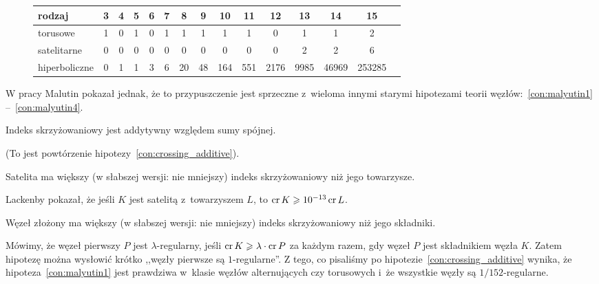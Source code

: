 \begin{figure}[H]
\renewcommand*{\arraystretch}{1.4}
\footnotesize
\begin{longtable}{lcccccccccccccc}
\hline
    \textbf{rodzaj} & 3 & 4 & 5 & 6 & 7 & 8  & 9  & 10  & 11  & 12   & 13   & 14    & 15     \\ \hline \endhead
    torusowe        & 1 & 0 & 1 & 0 & 1 & 1  & 1  & 1   & 1   & 0    & 1    & 1     & 2      \\
    satelitarne     & 0 & 0 & 0 & 0 & 0 & 0  & 0  & 0   & 0   & 0    & 2    & 2     & 6      \\
    hiperboliczne   & 0 & 1 & 1 & 3 & 6 & 20 & 48 & 164 & 551 & 2176 & 9985 & 46969 & 253285 \\
    \hline
\end{longtable}
\normalsize
\end{figure}

W pracy \cite{malyutin2016} Malutin pokazał jednak, że to przypuszczenie jest sprzeczne z~wieloma innymi starymi hipotezami teorii węzłów:~\ref{con:malyutin1} --~\ref{con:malyutin4}.
%

\begin{conjecture}
\label{con:malyutin1}%
    Indeks skrzyżowaniowy jest addytywny względem sumy spójnej.
%
%
\end{conjecture}

(To jest powtórzenie hipotezy~\ref{con:crossing_additive}).

\begin{conjecture}
    Satelita ma większy (w słabszej wersji: nie mniejszy) indeks skrzyżowaniowy niż jego towarzysze.
\end{conjecture}

Lackenby \cite{lackenby2014} pokazał, że jeśli $K$ jest satelitą z~towarzyszem $L$, to $\operatorname{cr} K \geqslant 10^{-13} \operatorname{cr} L$.
%

\begin{conjecture}
    Węzeł złożony ma większy (w słabszej wersji: nie mniejszy) indeks skrzyżowaniowy niż jego składniki.
\end{conjecture}

Mówimy, że węzeł pierwszy $P$ jest $\lambda$-regularny, jeśli $\operatorname{cr} K \geqslant \lambda \cdot \operatorname{cr} P$ za każdym razem, gdy węzeł $P$ jest składnikiem węzła $K$.
Zatem hipotezę można wysłowić krótko ,,węzły pierwsze są $1$-regularne''.
Z tego, co pisaliśmy po hipotezie~\ref{con:crossing_additive} wynika, że hipoteza~\ref{con:malyutin1} jest prawdziwa w~klasie węzłów alternujących czy torusowych i~że wszystkie węzły są $1/152$-regularne.

